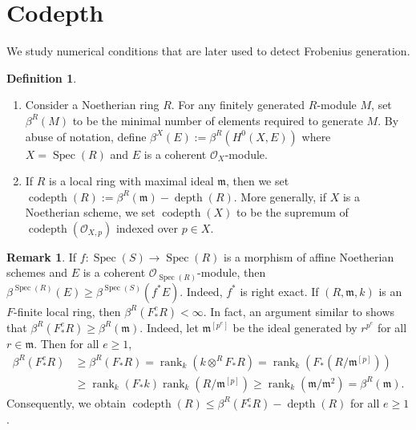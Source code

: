 \documentclass[11pt]{amsart}
\theoremstyle{plain}
\theoremstyle{definition}
\newtheorem{definition}[theorem]{Definition}
\newtheorem{remark}[theorem]{Remark}
\numberwithin{equation}{section}
\numberwithin{theorem}{section}
\begin{document}
\section{Codepth}
\label{sec:Frobenius_generation_Variation_of_codepth}

We study numerical conditions that are later used to detect Frobenius generation. 

\begin{definition}
    \hfill
    \begin{enumerate}
        \item Consider a Noetherian ring $R$. 
        For any finitely generated $R$-module $M$, set $\beta^R (M)$ to be the minimal number of elements required to generate $M$.
        By abuse of notation, define $\beta^X (E) := \beta^R (H^0(X,E))$ where $X=\operatorname{Spec}(R)$ and $E$ is a coherent $\mathcal{O}_X$-module.
        \item If $R$ is a local ring with maximal ideal $\mathfrak{m}$, then we set $\operatorname{codepth}(R) := \beta^R (\mathfrak{m}) - \operatorname{depth}(R)$. 
        More generally, if $X$ is a Noetherian scheme, we set $\operatorname{codepth}(X)$ to be the supremum of $\operatorname{codepth}(\mathcal{O}_{X,p})$ indexed over $p\in X$.
    \end{enumerate}
\end{definition}

\begin{remark}
    \label{rmk:codepth_facts}
    If $f\colon \operatorname{Spec}(S) \to \operatorname{Spec}(R)$ is a  morphism of affine Noetherian schemes and $E$ is a coherent $\mathcal{O}_{\operatorname{Spec}(R)}$-module, then $\beta^{\operatorname{Spec}(R)} (E) \geq \beta^{\operatorname{Spec}(S)} (f^\ast E)$. 
    Indeed, $f^\ast$ is right exact. 
    If $(R,\mathfrak{m},k)$ is an $F$-finite local ring, then $\beta^R (F_\ast^e R) <\infty$. 
    In fact, an argument similar to \cite[Proposition 1.1]{Kunz:1976} shows that $\beta^R (F_\ast^e R) \geq \beta^R (\mathfrak{m})$. 
    Indeed, let $\mathfrak{m}^{[p^e]}$ be the ideal generated by $r^{p^e}$ for all $r\in \mathfrak{m}$. 
    Then for all $e\geq 1$,
    \begin{displaymath}
        \begin{aligned}
            \beta^R (F_\ast^e R) 
            &\geq \beta^R (F_\ast R) 
            = \operatorname{rank}_k (k\otimes^R F_\ast R)
            = \operatorname{rank}_k (F_\ast (R/\mathfrak{m}^{[p]}))
            \\&\geq \operatorname{rank}_k (F_\ast k) \operatorname{rank}_k (R/\mathfrak{m}^{[p]}) \geq \operatorname{rank}_k (\mathfrak{m}/\mathfrak{m}^2) = \beta^R (\mathfrak{m}).
        \end{aligned}
    \end{displaymath}
    Consequently, we obtain $\operatorname{codepth}(R) \leq \beta^R (F_\ast^e R) - \operatorname{depth}(R)$ for all $e\geq 1$.
\end{remark}
\end{document}
